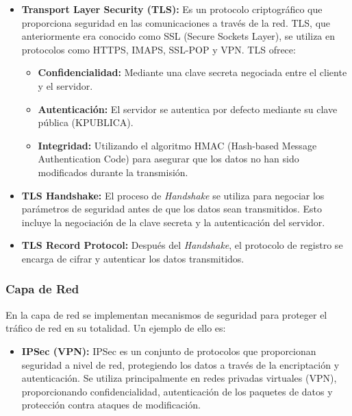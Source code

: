 \documentclass[a4paper,12pt]{article}
\begin{document}
\begin{itemize}
    \item \textbf{Transport Layer Security (TLS):} Es un protocolo criptográfico que proporciona seguridad en las comunicaciones a través de la red. TLS, que anteriormente era conocido como SSL (Secure Sockets Layer), se utiliza en protocolos como HTTPS, IMAPS, SSL-POP y VPN. TLS ofrece:
    \begin{itemize}
        \item \textbf{Confidencialidad:} Mediante una clave secreta negociada entre el cliente y el servidor.
        \item \textbf{Autenticación:} El servidor se autentica por defecto mediante su clave pública (KPUBLICA).
        \item \textbf{Integridad:} Utilizando el algoritmo HMAC (Hash-based Message Authentication Code) para asegurar que los datos no han sido modificados durante la transmisión.
    \end{itemize}
    \item \textbf{TLS Handshake:} El proceso de \textit{Handshake} se utiliza para negociar los parámetros de seguridad antes de que los datos sean transmitidos. Esto incluye la negociación de la clave secreta y la autenticación del servidor.
    \item \textbf{TLS Record Protocol:} Después del \textit{Handshake}, el protocolo de registro se encarga de cifrar y autenticar los datos transmitidos.
\end{itemize}

\subsubsection*{Capa de Red}

En la capa de red se implementan mecanismos de seguridad para proteger el tráfico de red en su totalidad. Un ejemplo de ello es:

\begin{itemize}
    \item \textbf{IPSec (VPN):} IPSec es un conjunto de protocolos que proporcionan seguridad a nivel de red, protegiendo los datos a través de la encriptación y autenticación. Se utiliza principalmente en redes privadas virtuales (VPN), proporcionando confidencialidad, autenticación de los paquetes de datos y protección contra ataques de modificación.
\end{itemize}
\end{document}
